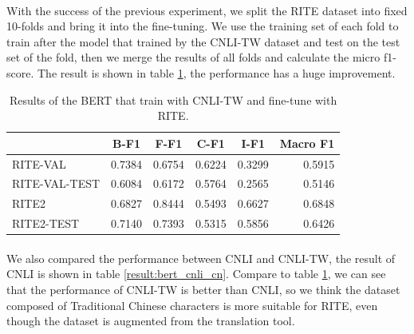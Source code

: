 \documentclass{article}
\begin{document}
\begin{CJK*}{UTF8}{bkai}
\paragraph{}
With the success of the previous experiment, we split the RITE dataset into fixed 10-folds and bring it into the fine-tuning. We use the training set of each fold to train after the model that trained by the CNLI-TW dataset and test on the test set of the fold, then we merge the results of all folds and calculate the micro f1-score. The result is shown in table \ref{result:bert_cnli_transfer}, the performance has a huge improvement.

\begin{table}[ht!]
  \centering
  \begin{tabular}{|l|r|r|r|r|r|}
  \hline
   & \multicolumn{1}{c|}{B-F1} & \multicolumn{1}{c|}{F-F1} & \multicolumn{1}{c|}{C-F1} & \multicolumn{1}{c|}{I-F1} & \multicolumn{1}{c|}{Macro F1} \\ \hline
  RITE-VAL & 0.7384 & 0.6754 & 0.6224 & 0.3299 & 0.5915 \\ \hline
  RITE-VAL-TEST & 0.6084 & 0.6172 & 0.5764 & 0.2565 & 0.5146 \\ \hline
  RITE2 & 0.6827 & 0.8444 & 0.5493 & 0.6627 & 0.6848 \\ \hline
  RITE2-TEST & 0.7140 & 0.7393 & 0.5315 & 0.5856 & 0.6426 \\ \hline
  \end{tabular}
  \caption{Results of the BERT that train with CNLI-TW and fine-tune with RITE.}
  \label{result:bert_cnli_transfer}
\end{table}

\paragraph{}
We also compared the performance between CNLI and CNLI-TW, the result of CNLI is shown in table \ref{result:bert_cnli_cn}. Compare to table \ref{result:bert_cnli_transfer}, we can see that the performance of CNLI-TW is better than CNLI, so we think the dataset composed of Traditional Chinese characters is more suitable for RITE, even though the dataset is augmented from the translation tool.


\end{CJK*}
\end{document}
